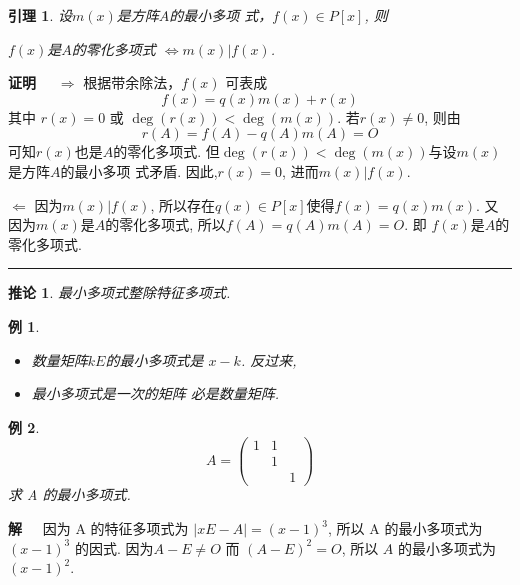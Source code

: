 \documentclass[13pt]{beamer}
\newtheorem{lem}{引理}
\newtheorem{exa}{例}
\newtheorem*{coro}{推论}
\def\qed{\nopagebreak\hfill{\rule{4pt}{7pt}}\medbreak}
\def\pf{{\bf 证明~~ }}
\def\sol{{\bf 解~~ }}
\begin{document}
\begin{frame}
\small{
\begin{lem}
	设$m(x)$是方阵$A$的最小多项
式，$f(x) \in P[x]$, 则
\begin{center}
$f(x)$是$A$的零化多项式 $\Leftrightarrow  m(x)|f(x)$.
\end{center}
\end{lem}
\pf 
$\Rightarrow$
根据带余除法，$f(x)$ 可表成
\[
f(x)=q(x) m(x)+r(x)
\]
其中 $r(x)=0$ 或 $\deg(r(x))<\deg \left(m(x)\right)$.
若$r(x)\neq 0$, 
则由$$r({A}) =f({A})-q({A}) m({A})={O}$$
可知$r(x)$也是$A$的零化多项式. 但$\deg(r(x))<\deg \left(m(x)\right)$与设$m(x)$是方阵$A$的最小多项
式矛盾. 因此,$r(x)=0$, 进而$m(x)|f(x)$.

$\Leftarrow$
 因为$m(x)|f(x)$, 所以存在$q(x) \in P[x]$使得$f(x)=q(x) m(x)$.
又因为$m(x)$是$A$的零化多项式, 所以$f(A)=q(A) m(A)={O}.$
即 $f(x)$是$A$的零化多项式.
\qed

\begin{coro}
最小多项式整除特征多项式. 
\end{coro}
}

\end{frame}


\begin{frame}
\begin{exa}
\begin{itemize}
\item 数量矩阵$kE$的最小多项式是
$x-k$.  反过来, 
\item 最小多项式是一次的矩阵
必是数量矩阵. 
\end{itemize}
\end{exa}


\begin{exa}
\[
{A}=\left(\begin{array}{ccc}
1 & 1 & \\
& 1 & \\
& & 1
\end{array}\right)
\]
求 A 的最小多项式.  
\end{exa}
\sol 
因为 A 的特征多项式为 $|x {E}-{A}|=(x-1)^{3}$,
所以 A 的最小多项式为$(x-1)^{3}$ 的因式.
因为$A-E \neq O$ 而 $({A}-{E})^{2}={O}$, 所以  ${A}$ 的最小多项式为 $(x-1)^{2}$.
\end{frame}
\end{document}
